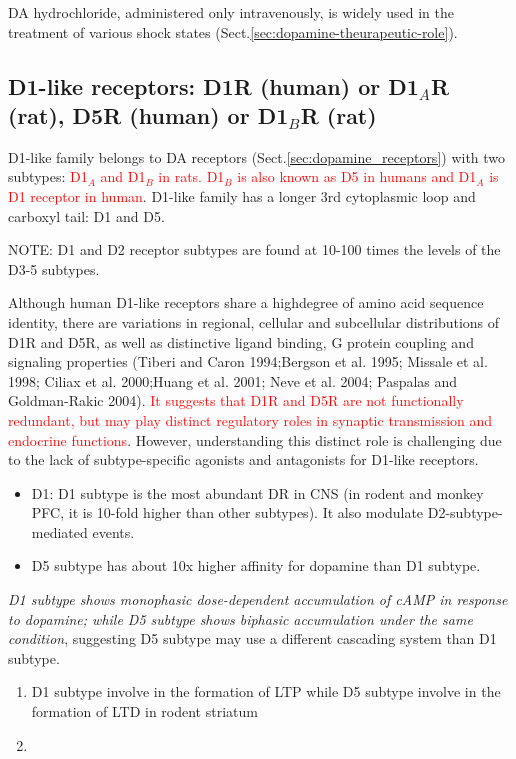 DA hydrochloride, administered only intravenously, is
widely used in the treatment of various shock states
(Sect.\ref{sec:dopamine-theurapeutic-role}).


\subsection{D1-like receptors: D1R (human) or D1$_A$R (rat), D5R (human) or
D1$_B$R (rat)}
\label{sec:D1-like-receptors}


D1-like family belongs to DA receptors (Sect.\ref{sec:dopamine_receptors}) with
two subtypes: \textcolor{red}{D1$_A$ and D1$_B$ in rats. D1$_B$ is also known as
D5 in humans and D1$_A$ is D1 receptor in human}.
D1-like family has a longer 3rd cytoplasmic loop and carboxyl tail: D1 and D5.

NOTE: D1 and D2 receptor subtypes are found at 10-100 times the levels of the
D3-5 subtypes.   

Although human D1-like receptors share a highdegree of amino acid sequence
identity, there are variations in regional, cellular and subcellular
distributions of D1R and D5R, as well as distinctive ligand binding, G protein
coupling and signaling properties (Tiberi and Caron 1994;Bergson et al. 1995;
Missale et al. 1998; Ciliax et al. 2000;Huang et al. 2001; Neve et al. 2004;
Paspalas and Goldman-Rakic 2004). \textcolor{red}{It suggests that D1R and D5R
are not functionally redundant, but may play distinct regulatory roles in
synaptic transmission and endocrine functions}.
However, understanding this distinct role is challenging due to  the lack of
subtype-specific agonists and antagonists for D1-like receptors.

\begin{itemize}
  \item D1: D1 subtype is the most abundant DR in CNS (in rodent and monkey PFC,
  it is 10-fold higher than other subtypes). It also modulate D2-subtype-mediated events.
 
  \item D5 subtype has about 10x higher affinity for dopamine than D1 subtype.  
\end{itemize}

{\it D1 subtype shows monophasic dose-dependent accumulation of cAMP in response
to dopamine; while D5 subtype shows biphasic accumulation under the same
condition}, suggesting D5 subtype may use a different cascading system than D1
subtype.
\begin{enumerate}
  \item  D1 subtype involve in the formation of LTP while D5 subtype involve
in the formation of LTD in rodent striatum \citep{}
  
  \item 
\end{enumerate}

